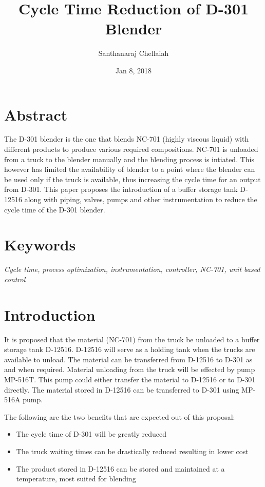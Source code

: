 \documentclass[a4paper,oneside]{article}
\author{Santhanaraj Chellaiah}
\date{Jan 8, 2018}
\title{Cycle Time Reduction of D-301 Blender}
\begin{document}
\maketitle
\section{Abstract}
\label{sec:orgc2ee538}
The D-301 blender is the one that blends NC-701 (highly viscous
liquid) with different products to produce various required
compositions. NC-701 is unloaded from a truck to the blender manually
and the blending process is intiated. This however has limited the
availability of blender to a point where the blender can be used only
if the truck is available, thus increasing the cycle time for an
output from D-301. This paper proposes the introduction of a buffer
storage tank D-12516 along with piping, valves, pumps and other
instrumentation to reduce the cycle time of the D-301 blender.

\section{Keywords}
\label{sec:orgbb1259a}
\emph{Cycle time, process optimization, instrumentation, controller, NC-701, unit based control}

\section{Introduction}
\label{sec:org44e41e8}
It is proposed that the material (NC-701) from the truck be unloaded
to a buffer storage tank D-12516. D-12516 will serve as a holding tank
when the trucks are available to unload. The material can be
transferred from D-12516 to D-301 as and when required. Material
unloading from the truck will be effected by pump MP-516T. This pump
could either transfer the material to D-12516 or to D-301
directly. The material stored in D-12516 can be transferred to D-301
using MP-516A pump.  

The following are the two benefits that are expected out of this proposal: 
\begin{itemize}
\item The cycle time of D-301 will be greatly reduced
\item The truck waiting times can be drastically reduced resulting in lower cost
\item The product stored in D-12516 can be stored and maintained at a
temperature, most suited for blending
\end{itemize}
\end{document}
